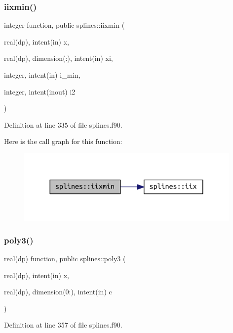 \subsubsection{\texorpdfstring{iixmin()}{iixmin()}}
{\footnotesize\ttfamily integer function, public splines\+::iixmin (\begin{DoxyParamCaption}\item[{real(dp), intent(in)}]{x,  }\item[{real(dp), dimension(\+:), intent(in)}]{xi,  }\item[{integer, intent(in)}]{i\+\_\+min,  }\item[{integer, intent(inout)}]{i2 }\end{DoxyParamCaption})}



Definition at line 335 of file splines.\+f90.

Here is the call graph for this function\+:
\nopagebreak
\begin{figure}[H]
\begin{center}
\leavevmode
\includegraphics[width=312pt]{namespacesplines_a150ebea82fdfc65f1928d6c8d0a249d5_cgraph}
\end{center}
\end{figure}
\mbox{\label{namespacesplines_ac73e6ec2345cfda7cfa18da6c24be86d}} 
\subsubsection{\texorpdfstring{poly3()}{poly3()}}
{\footnotesize\ttfamily real(dp) function, public splines\+::poly3 (\begin{DoxyParamCaption}\item[{real(dp), intent(in)}]{x,  }\item[{real(dp), dimension(0\+:), intent(in)}]{c }\end{DoxyParamCaption})}



Definition at line 357 of file splines.\+f90.

